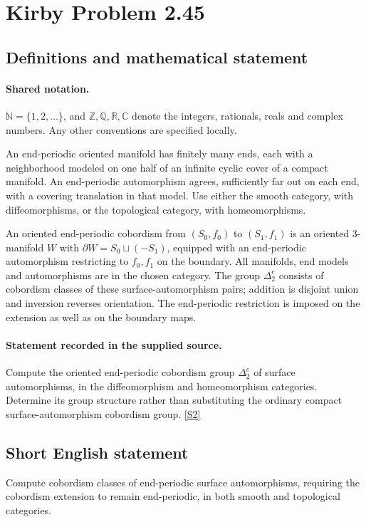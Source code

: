 \documentclass[11pt]{article}
\newcommand{\sref}[2]{\hyperlink{source:#1:#2}{[S#2]}}
\begin{document}
\section{Kirby Problem 2.45}\label{statement}

\subsection{Definitions and mathematical statement}

\paragraph{Shared notation.}$\mathbb N=\{1,2,\ldots\}$, and $\mathbb Z,\mathbb Q,\mathbb R,\mathbb C$ denote the integers, rationals, reals and complex numbers. Any other conventions are specified locally.


An end-periodic oriented manifold has finitely many ends, each with a neighborhood modeled on one half of an infinite cyclic cover of a compact manifold. An end-periodic automorphism agrees, sufficiently far out on each end, with a covering translation in that model. Use either the smooth category, with diffeomorphisms, or the topological category, with homeomorphisms.

An oriented end-periodic cobordism from $(S_0,f_0)$ to $(S_1,f_1)$ is an oriented 3-manifold $W$ with $\partial W=S_0\sqcup(-S_1)$, equipped with an end-periodic automorphism restricting to $f_0,f_1$ on the boundary. All manifolds, end models and automorphisms are in the chosen category. The group $\Delta^e_2$ consists of cobordism classes of these surface-automorphism pairs; addition is disjoint union and inversion reverses orientation. The end-periodic restriction is imposed on the extension as well as on the boundary maps.
\paragraph{Statement recorded in the supplied source.}
Compute the oriented end-periodic cobordism group $\Delta^e_2$ of surface automorphisms, in the diffeomorphism and homeomorphism categories. Determine its group structure rather than substituting the ordinary compact surface-automorphism cobordism group. \sref{statement}{2}

\subsection{Short English statement}
Compute cobordism classes of end-periodic surface automorphisms, requiring the cobordism extension to remain end-periodic, in both smooth and topological categories.
\end{document}
